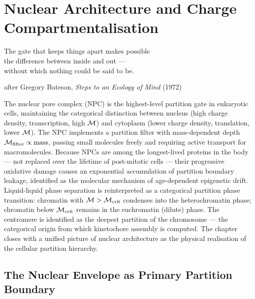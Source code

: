 
\chapter{Nuclear Architecture and Charge Compartmentalisation}
\label{chap:nuclear_architecture}

\epigraph{%
  The gate that keeps things apart makes possible\\
  the difference between inside and out ---\\
  without which nothing could be said to be.%
}{after Gregory Bateson, \textit{Steps to an Ecology of Mind} (1972)}

\begin{chapterbox}
The nuclear pore complex (NPC) is the highest-level partition gate in
eukaryotic cells, maintaining the categorical distinction between nucleus
(high charge density, transcription, high $\mathcal{M}$) and cytoplasm (lower
charge density, translation, lower $\mathcal{M}$). The NPC implements a partition
filter with mass-dependent depth $\mathcal{M}_{\mathrm{filter}} \propto \text{mass}$,
passing small molecules freely and requiring active transport for macromolecules.
Because NPCs are among the longest-lived proteins in the body --- not replaced
over the lifetime of post-mitotic cells --- their progressive oxidative damage
causes an exponential accumulation of partition boundary leakage, identified
as the molecular mechanism of age-dependent epigenetic drift. Liquid-liquid
phase separation is reinterpreted as a categorical partition phase transition:
chromatin with $\mathcal{M} > \mathcal{M}_{\mathrm{crit}}$ condenses into the
heterochromatin phase; chromatin below $\mathcal{M}_{\mathrm{crit}}$ remains in
the euchromatin (dilute) phase. The centromere is identified as the deepest
partition of the chromosome --- the categorical origin from which kinetochore
assembly is computed. The chapter closes with a unified picture of nuclear
architecture as the physical realisation of the cellular partition hierarchy.
\end{chapterbox}

\section{The Nuclear Envelope as Primary Partition Boundary}
\label{sec:nuclear_envelope}

